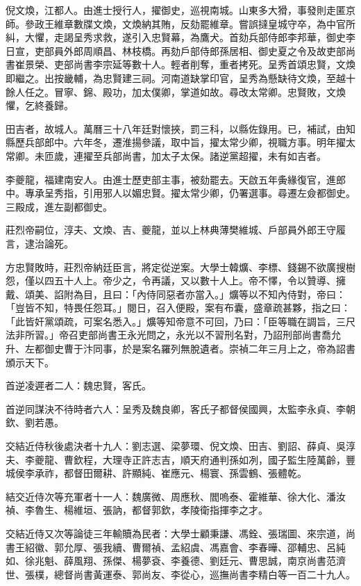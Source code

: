 \begin{pinyinscope}
倪文煥，江都人。由進士授行人，擢御史，巡視南城。山東多大猾，事發則走匿京師。參政王維章數牒文煥，文煥納其賄，反劾罷維章。嘗誤撻皇城守卒，為中官所糾，大懼，走謁呈秀求救，遂引入忠賢幕，為鷹犬。首劾兵部侍郎李邦華，御史李日宣，吏部員外郎周順昌、林枝橋。再劾戶部侍郎孫居相、御史夏之令及故吏部尚書崔景榮、吏部尚書李宗延等數十人。輕者削奪，重者拷死。呈秀首頌忠賢，文煥即繼之。出按畿輔，為忠賢建三祠。河南道缺掌印官，呈秀為懸缺待文煥，至越十餘人任之。冒寧、錦、殿功，加太僕卿，掌道如故。尋改太常卿。忠賢敗，文煥懼，乞終養歸。

田吉者，故城人。萬曆三十八年廷對懷挾，罰三科，以縣佐錄用。已，補試，由知縣歷兵部郎中。六年冬，遷淮揚參議，取中旨，擢太常少卿，視職方事。明年擢太常卿。未匝歲，連擢至兵部尚書，加太子太保。諸逆黨超擢，未有如吉者。

李夔龍，福建南安人。由進士歷吏部主事，被劾罷去。天啟五年夤緣復官，進郎中。專承呈秀指，引用邪人以媚忠賢。擢太常少卿，仍署選事。尋遷左僉都御史。三殿成，進左副都御史。

莊烈帝嗣位，淳夫、文煥、吉、夔龍，並以上林典薄樊維城、戶部員外郎王守履言，逮治論死。

方忠賢敗時，莊烈帝納廷臣言，將定從逆案。大學士韓爌、李標、錢錫不欲廣搜樹怨，僅以四五十人上。帝少之，令再議，又以數十人上。帝不懌，令以贊導、擁戴、頌美、諂附為目，且曰：「內侍同惡者亦當入。」爌等以不知內侍對，帝曰：「豈皆不知，特畏任怨耳。」閱日，召入便殿，案有布囊，盛章疏甚夥，指之曰：「此皆奸黨頌疏，可案名悉入。」爌等知帝意不可回，乃曰：「臣等職在調旨，三尺法非所習。」帝召吏部尚書王永光問之，永光以不習刑名對，乃詔刑部尚書喬允升、左都御史曹于汴同事，於是案名羅列無脫遺者。崇禎二年三月上之，帝為詔書頒示天下。

首逆凌遲者二人：魏忠賢，客氏。

首逆同謀決不待時者六人：呈秀及魏良卿，客氏子都督侯國興，太監李永貞、李朝欽、劉若愚。

交結近侍秋後處決者十九人：劉志選、梁夢環、倪文煥、田吉、劉詔、薛貞、吳淳夫、李夔龍、曹欽程，大理寺正許志吉，順天府通判孫如冽，國子監生陸萬齡，豐城侯李承祚，都督田爾耕、許顯純、崔應元、楊寰、孫雲鶴、張體乾。

結交近侍次等充軍者十一人：魏廣微、周應秋、閻嗚泰、霍維華、徐大化、潘汝禎、李魯生、楊維垣、張訥，都督郭欽，孝陵衛指揮李之才。

交結近侍又次等論徒三年輸贖為民者：大學士顧秉謙、馮銓、張瑞圖、來宗道，尚書王紹徽、郭允厚、張我續、曹爾禎、孟紹虞、馮嘉會、李春曄、邵輔忠、呂純如、徐兆魁、薛風翔、孫傑、楊夢袞、李養德、劉廷元、曹思誠，南京尚書范濟世、張樸，總督尚書黃運泰、郭尚友、李從心，巡撫尚書李精白等一百二十九人。


\end{pinyinscope}
